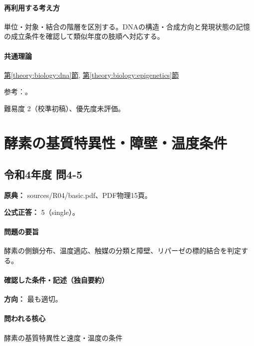 \paragraph{再利用する考え方} 単位・対象・結合の階層を区別する。DNAの構造・合成方向と発現状態の記憶の成立条件を確認して類似年度の肢順へ対応する。

\paragraph{共通理論} \hyperref[theory:biology:dna]{第\ref*{theory:biology:dna}節}, \hyperref[theory:biology:epigenetics]{第\ref*{theory:biology:epigenetics}節}

\par 参考：\cite{nhgri_dna,nhgri_epigenomics}。

\par 難易度 2（校準初稿）、優先度未評価。

\section{酵素の基質特異性・障壁・温度条件}

\subsection{令和4年度 問4-5}
\label{q:r04-reg-basic-4-5}

\noindent\textbf{原典：} sources/R04/basic.pdf、PDF物理15頁。

\textbf{公式正答：} 5（single）。

\paragraph{問題の要旨} 酵素の側鎖分布、温度適応、触媒の分類と障壁、リパーゼの標的結合を判定する。

\paragraph{確認した条件・記述（独自要約）}\mbox{}\par

\noindent\textbf{方向：} 最も適切。\par

\paragraph{問われる核心} 酵素の基質特異性と速度・温度の条件

